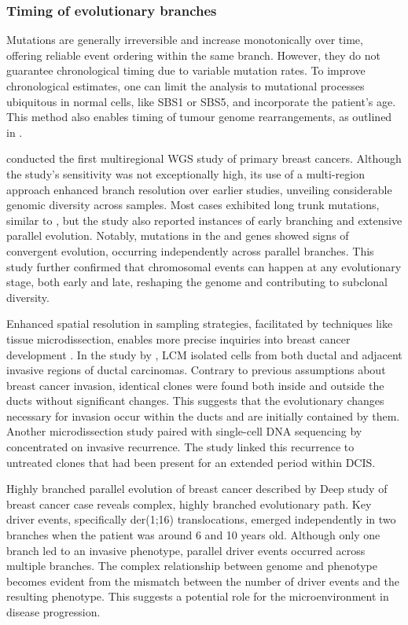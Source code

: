 {    \subsubsection*{Timing of evolutionary branches}
    Mutations are generally irreversible and increase monotonically over time, offering reliable event ordering within the same branch. However, they do not guarantee chronological timing due to variable mutation rates. To improve chronological estimates, one can limit the analysis to mutational processes ubiquitous in normal cells, like SBS1 or SBS5, and incorporate the patient's age. This method also enables timing of tumour genome rearrangements, as outlined in \textcite{Gerstung2020-sg}.
    }

\textcite{Yates2015-xk} conducted the first multiregional \ac{WGS} study of primary breast cancers. Although the study's sensitivity was not exceptionally high, its use of a multi-region approach enhanced branch resolution over earlier studies, unveiling considerable genomic diversity across samples. Most cases exhibited long trunk mutations, similar to \textcite{Nik-Zainal2012-zz}, but the study also reported instances of early branching and extensive parallel evolution. Notably, mutations in the  and  genes showed signs of convergent evolution, occurring independently across parallel branches. This study further confirmed that chromosomal events can happen at any evolutionary stage, both early and late, reshaping the genome and contributing to subclonal diversity.

Enhanced spatial resolution in sampling strategies, facilitated by techniques like tissue microdissection, enables more precise inquiries into breast cancer development . In the study by \textcite{Casasent2018-gx}, \ac{LCM} isolated cells from both ductal and adjacent invasive regions of ductal carcinomas. Contrary to previous assumptions about breast cancer invasion, identical clones were found both inside and outside the ducts without significant changes. This suggests that the evolutionary changes necessary for invasion occur within the ducts and are initially contained by them. Another microdissection study paired with single-cell DNA sequencing by \textcite{Lips2022-kv} concentrated on invasive recurrence. The study linked this recurrence to untreated clones that had been present for an extended period within \ac{DCIS}.

{Highly branched parallel evolution of breast cancer described by \textcite{Nishimura2023-mk}}
{Deep study of breast cancer case reveals complex, highly branched evolutionary path. Key driver events, specifically der(1;16) translocations, emerged independently in two branches when the patient was around 6 and 10 years old. Although only one branch led to an invasive phenotype, parallel driver events occurred across multiple branches. The complex relationship between genome and phenotype becomes evident from the mismatch between the number of driver events and the resulting phenotype. This suggests a potential role for the microenvironment in disease progression.}

